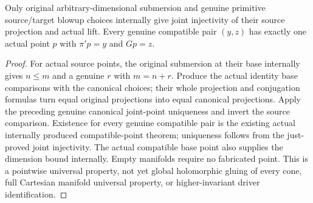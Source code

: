 \begin{theorem}
\label{hir:submersion-blowup-pivot-chosen-joint-unique}
\leanok
{}
Only original arbitrary-dimensional submersion and genuine primitive
source/target blowup choices internally give joint injectivity of their
source projection and actual lift. Every genuine compatible pair $(y,z)$
has exactly one actual point $p$ with $\pi'p=y$ and $Gp=z$.
\end{theorem}
\begin{proof}
For actual source points, the original submersion at their base internally
gives $n\leq m$ and a genuine $r$ with $m=n+r$. Produce the actual identity
base comparisons with the canonical choices; their whole projection and
conjugation formulas turn equal original projections into equal canonical
projections. Apply the preceding genuine canonical joint-point uniqueness
and invert the source comparison. Existence for every genuine compatible
pair is the existing actual internally produced compatible-point theorem;
uniqueness follows from the just-proved joint injectivity. The actual
compatible base point also supplies the dimension bound internally. Empty
manifolds require no fabricated point. This is a pointwise universal
property, not yet global holomorphic gluing of every cone, full Cartesian
manifold universal property, or higher-invariant driver identification.
\end{proof}
